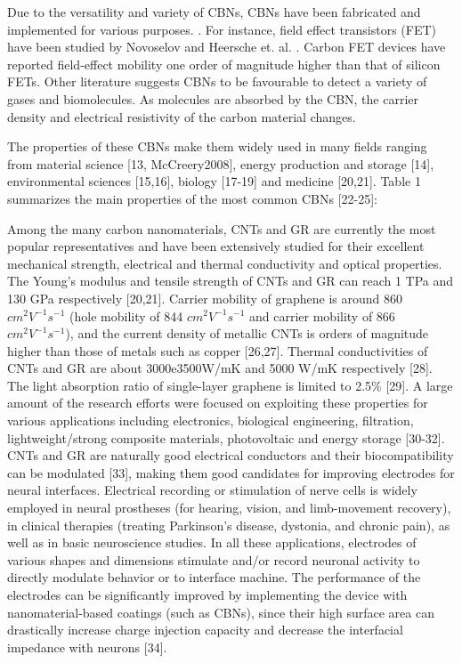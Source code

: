 Due to the versatility and variety of CBNs, CBNs have been fabricated and implemented for various purposes. \cite{Geim2011, Katsnelson2008, Li2008, Geim2007, Geim2009, Siddiqui2019}. For instance, field effect transistors (FET) have been studied by Novoselov \cite{Novoselov2004} and Heersche et. al. \cite{Heersche2007}. Carbon FET devices have reported field-effect mobility one order of magnitude higher than that of silicon FETs. Other literature suggests CBNs to be favourable to detect a variety of gases and biomolecules. \cite{} As molecules are absorbed by the CBN, the carrier density and electrical resistivity of the carbon material changes. 


The properties of these CBNs make them widely used in many
fields ranging from material science [13, McCreery2008], energy production and storage [14], environmental sciences [15,16], biology [17-19] and medicine [20,21]. Table 1 summarizes the main properties of the most common CBNs [22-25]:

Among the many carbon nanomaterials, CNTs and GR are currently the most popular representatives and have been extensively studied for their excellent mechanical strength, electrical and thermal conductivity and optical properties. The Young's modulus and tensile strength of CNTs and GR can reach 1 TPa and 130 GPa respectively [20,21]. Carrier mobility of graphene is around 860 $cm^{2} V^{-1} s^{-1}$ (hole mobility of 844 $cm^{2} V^{-1} s^{-1}$ and carrier mobility of 866 $cm^{2} V^{-1} s^{-1}$), and the current density of metallic CNTs is orders of magnitude higher than those of metals such as copper [26,27]. Thermal conductivities of CNTs and GR are about 3000e3500W/mK and 5000 W/mK respectively [28]. The light absorption ratio of single-layer graphene is limited to 2.5\% [29]. A large amount of the research efforts were focused on exploiting these properties for various applications including electronics, biological engineering, filtration, lightweight/strong composite materials, photovoltaic and energy storage [30-32]. CNTs and GR are naturally good electrical conductors and their biocompatibility can be modulated [33], making them good candidates for improving electrodes for neural interfaces. Electrical recording or stimulation of nerve cells is widely employed in neural prostheses (for hearing, vision, and limb-movement recovery), in clinical therapies (treating Parkinson's disease, dystonia, and chronic pain), as well as in basic neuroscience studies. In all these applications, electrodes of various shapes and dimensions stimulate and/or record neuronal activity to directly modulate behavior or to interface machine. The performance of the electrodes can be significantly improved by implementing the device with nanomaterial-based coatings (such as CBNs), since their high surface area can drastically increase charge injection capacity and decrease the interfacial impedance with neurons [34].

